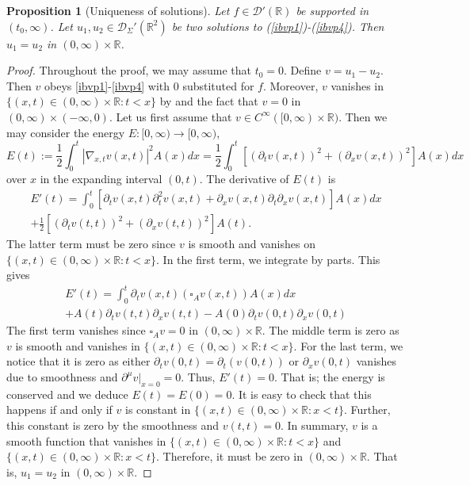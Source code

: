 \documentclass[10pt,a4paper]{article}
\theoremstyle{plain}
\newtheorem{proposition}[theorem]{Proposition}
\theoremstyle{definition}
\theoremstyle{remark}
\numberwithin{equation}{section}
\newcommand{\R}{\mathbb{R}}
\begin{document}
\begin{proposition}[Uniqueness of solutions]\label{uniq-pro}
Let $f \in \mathcal{D}'(\R)$ be supported in $(t_0,\infty)$.  Let $u_1,u_2 \in \mathcal{D}_{\Sigma}'(\R^2) $ be two solutions to (\ref{ibvp1})-(\ref{ibvp4}). 
Then $u_1 = u_2 $ in $(0,\infty) \times \R$. 
\end{proposition}
\begin{proof}
Throughout the proof, we may assume that $t_0 = 0$. 
Define $v = u_1- u_2$. 
Then $v$ obeys \eqref{ibvp1}-\eqref{ibvp4} with $0$ substituted for $f$.  Moreover, $v$ vanishes in $\{ (x,t) \in (0,\infty) \times \R : t < x \}$ by \cite[Th. 5.1.6]{duistermaat-FIOs} 
and the fact that $v=0$ in  $(0,\infty) \times (-\infty,0)$.
Let us first assume  that $v \in C^\infty ([0,\infty) \times \R)$. 
Then we may consider the energy $E: [0,\infty) \to [0,\infty)$, 
\[
 E(t) := \frac{1}{2} \int_0^t |\nabla_{x,t}v(x,t)|^2 A(x) d x = \frac{1}{2} \int_0^t  [ (\partial_t v(x,t))^2 + (\partial_x v(x,t))^2 ]A (x) d x
\]
 over $x$ in the expanding interval $(0,t)$. 
The derivative of $E(t)$ is 
\begin{align}
E'(t) =   \int_0^t  [ \partial_t v(x,t)    \partial_t^2 v(x,t) + \partial_x v(x,t) \partial_t \partial_x v(x,t)  ] A(x) dx \\+ \frac{1}{2}   [ (\partial_t v(t,t))^2 + (\partial_x v(t,t))^2 ] A (t).
\end{align}
The latter term must be zero since $v$ is smooth and vanishes on $\{ (x,t) \in (0,\infty) \times \R : t < x \}$.
In the first term, we integrate by parts. This gives 
\begin{align}
E'(t) 
=  \int_0^t   \partial_t v(x,t)  (   \square_A v(x,t)  ) A(x)dx \\
+A(t) \partial_t v(t,t)  \partial_x v(t,t) - A(0) \partial_t v(0,t)  \partial_x v(0,t)  
\end{align}
The first term vanishes since $  \square_A v  = 0 $ in $(0,\infty) \times \R$. The middle term is zero as $v$ is smooth and vanishes  in $\{ (x,t) \in (0,\infty) \times \R : t < x \}$. 
For the last term, we notice that {it} is zero as either $\partial_t v(0,t) = \partial_t  ( v(0,t) ) $ or $\partial_x v(0,t) $ {vanishes} due to smoothness and $\partial^\mu v|_{x=0} =0$. Thus, $E'(t) = 0$. That is; the energy is conserved and we deduce $E(t) = E(0) = 0$. 
It is easy to check that this happens if and only if $v$ is constant in $\{ (x,t)  \in (0,\infty) \times \R  :  x< t \}   $. Further, this constant is zero by the smoothness and $v(t,t)= 0$. 
In summary, $v$ is a smooth function that vanishes in $\{ (x,t) \in (0,\infty) \times \R : t < x \}$ and $\{ (x,t) \in (0,\infty) \times \R : x < t \}$. Therefore, it must be zero in  $(0,\infty) \times \R$. 
That is,  $u_1 = u_2$ in  $(0,\infty) \times \R$. 


\end{proof}
\end{document}
